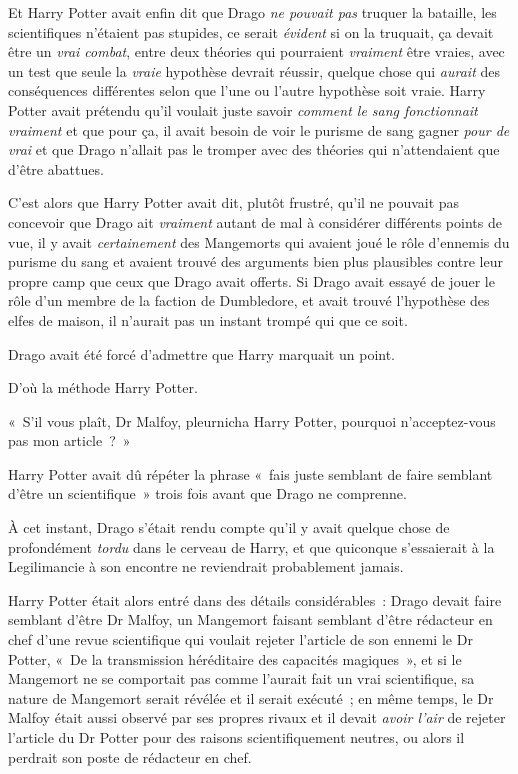 Et Harry Potter avait enfin dit que Drago \emph{ne pouvait pas} truquer la bataille, les scientifiques n'étaient pas stupides, ce serait \emph{évident} si on la truquait, ça devait être un \emph{vrai combat}, entre deux théories qui pourraient \emph{vraiment} être vraies, avec un test que seule la \emph{vraie} hypothèse devrait réussir, quelque chose qui \emph{aurait} des conséquences différentes selon que l'une ou l'autre hypothèse soit vraie.
Harry Potter avait prétendu qu'il voulait juste savoir \emph{comment le sang fonctionnait vraiment} et que pour ça, il avait besoin de voir le purisme de sang gagner \emph{pour de vrai} et que Drago n'allait pas le tromper avec des théories qui n'attendaient que d'être abattues.

C'est alors que Harry Potter avait dit, plutôt frustré, qu'il ne pouvait pas concevoir que Drago ait \emph{vraiment} autant de mal à considérer différents points de vue, il y avait \emph{certainement} des Mangemorts qui avaient joué le rôle d'ennemis du purisme du sang et avaient trouvé des arguments bien plus plausibles contre leur propre camp que ceux que Drago avait offerts.
Si Drago avait essayé de jouer le rôle d'un membre de la faction de Dumbledore, et avait trouvé l'hypothèse des elfes de maison, il n'aurait pas un instant trompé qui que ce soit.

Drago avait été forcé d'admettre que Harry marquait un point.

D'où la méthode Harry Potter.

«~S'il vous plaît, Dr Malfoy, pleurnicha Harry Potter, pourquoi n'acceptez-vous pas mon article~?~»

Harry Potter avait dû répéter la phrase «~fais juste semblant de faire semblant d'être un scientifique~» trois fois avant que Drago ne comprenne.

À cet instant, Drago s'était rendu compte qu'il y avait quelque chose de profondément \emph{tordu} dans le cerveau de Harry, et que quiconque s'essaierait à la Legilimancie à son encontre ne reviendrait probablement jamais.

Harry Potter était alors entré dans des détails considérables~: Drago devait faire semblant d'être Dr Malfoy, un Mangemort faisant semblant d'être rédacteur en chef d'une revue scientifique qui voulait rejeter l'article de son ennemi le Dr Potter, «~De la transmission héréditaire des capacités magiques~», et si le Mangemort ne se comportait pas comme l'aurait fait un vrai scientifique, sa nature de Mangemort serait révélée et il serait exécuté~; en même temps, le Dr Malfoy était aussi observé par ses propres rivaux et il devait \emph{avoir l'air} de rejeter l'article du Dr Potter pour des raisons scientifiquement neutres, ou alors il perdrait son poste de rédacteur en chef.

